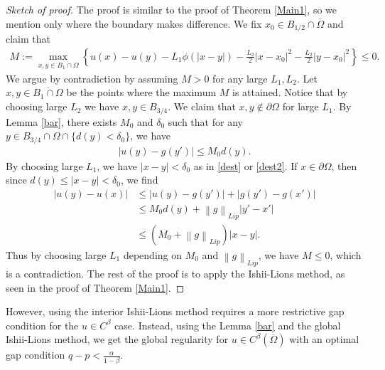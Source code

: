 \documentclass[reqno]{amsart}
\theoremstyle{plain}
\theoremstyle{definition}
\theoremstyle{remark}
\newcommand{\norm}[1]{\left\lVert#1\right\rVert}
\numberwithin{equation}{section}
\begin{document}
\begin{proof}[Sketch of proof]
    The proof is similar to the proof of Theorem \ref{Main1}, so we mention only where the boundary makes difference.
    We fix $x_0 \in B_{1/2} \cap \overline{\Omega}$ and claim that
    \begin{align*}
        M:= \max_{x,y\in \overline{B_1\cap \Omega}}  \left\{ u(x) - u(y) - L_1\phi(|x-y|) - \frac{L_2}{2}|x-x_0|^2 -\frac{L_2}{2}|y-x_0|^2 \right\} \leq 0.
    \end{align*}
    We argue by contradiction by assuming $M>0$ for any large $L_1, L_2$.
    Let $x,y \in \overline{B_1\cap \Omega}$ be the points where the maximum $M$ is attained.
    Notice that by choosing large $L_2$ we have $x,y \in B_{3/4} $.
    We claim that $x,y \notin \partial \Omega$ for large $L_1$.
    By Lemma \ref{bar}, there exists $M_0$ and $\delta_0$ such that for any $y \in B_{3/4} \cap \Omega \cap \{d(y)<\delta_0\}$, we have
    \begin{align*}
        |u(y)-g(y')| \leq M_0d(y).
    \end{align*}
    By choosing large $L_1$, we have $|x-y| <\delta_0$ as in \eqref{dest} or \eqref{dest2}. If $x \in \partial\Omega$, then since $d(y) \leq |x-y|<\delta_0$, we find
    \begin{align*}
        |u(y)-u(x)| &\leq |u(y)-g(y')| + |g(y')-g(x')| \\
        &\leq M_0d(y) + \norm{g}_{Lip}|y'-x'|\\
        &\leq (M_0 + \norm{g}_{Lip})|x-y|.
    \end{align*}
    Thus by choosing large $L_1$ depending on $M_0$ and $\norm{g}_{Lip}$, we have $M\leq0$, which is a contradiction.
    The rest of the proof is to apply the Ishii-Lions method, as seen in the proof of Theorem \ref{Main1}.
\end{proof}

However, using the interior Ishii-Lions method requires a more restrictive gap condition for the $u \in C^\beta$ case.
Instead, using the Lemma \ref{bar} and the global Ishii-Lions method, we get the global regularity for $u \in C^\beta(\overline{\Omega})$ with an optimal gap condition $q-p < \frac{\alpha}{1-\beta}$.
\end{document}
